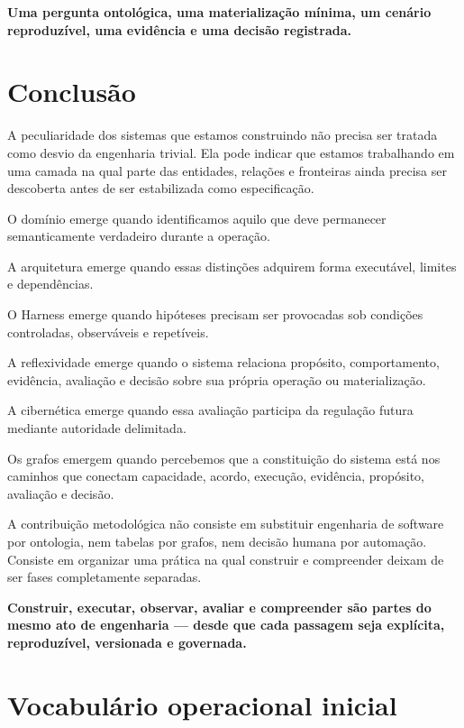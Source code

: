 \documentclass[11pt,a4paper,oneside]{article}
\begin{document}
\begin{principio}
\centering
\textbf{Uma pergunta ontológica, uma materialização mínima, um cenário reproduzível, uma evidência e uma decisão registrada.}
\end{principio}

\section{Conclusão}

A peculiaridade dos sistemas que estamos construindo não precisa ser tratada como desvio da engenharia trivial. Ela pode indicar que estamos trabalhando em uma camada na qual parte das entidades, relações e fronteiras ainda precisa ser descoberta antes de ser estabilizada como especificação.

O domínio emerge quando identificamos aquilo que deve permanecer semanticamente verdadeiro durante a operação.

A arquitetura emerge quando essas distinções adquirem forma executável, limites e dependências.

O Harness emerge quando hipóteses precisam ser provocadas sob condições controladas, observáveis e repetíveis.

A reflexividade emerge quando o sistema relaciona propósito, comportamento, evidência, avaliação e decisão sobre sua própria operação ou materialização.

A cibernética emerge quando essa avaliação participa da regulação futura mediante autoridade delimitada.

Os grafos emergem quando percebemos que a constituição do sistema está nos caminhos que conectam capacidade, acordo, execução, evidência, propósito, avaliação e decisão.

A contribuição metodológica não consiste em substituir engenharia de software por ontologia, nem tabelas por grafos, nem decisão humana por automação. Consiste em organizar uma prática na qual construir e compreender deixam de ser fases completamente separadas.

\begin{principio}
\centering\Large
\textbf{Construir, executar, observar, avaliar e compreender são partes do mesmo ato de engenharia --- desde que cada passagem seja explícita, reproduzível, versionada e governada.}
\end{principio}

\appendix
\section{Vocabulário operacional inicial}
\end{document}
